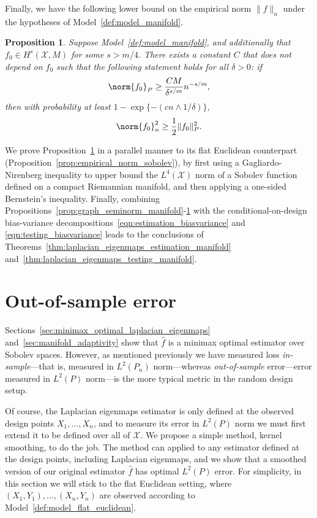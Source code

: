 \documentclass{article}
\newcommand{\1}{\mathbf{1}}
\newcommand{\Xset}{\mathcal{X}}
\newcommand{\Leb}{L}
\newcommand{\mc}[1]{\mathcal{#1}}
\newcommand{\wh}[1]{\widehat{#1}}
\theoremstyle{alden}
\theoremstyle{aldenthm}
\newtheorem{proposition}{Proposition}
\theoremstyle{definition}
\theoremstyle{remark}
\begin{document}
Finally, we have the following lower bound on the empirical norm $\|f\|_n$ under the hypotheses of Model~\ref{def:model_manifold}. 
\begin{proposition}
	\label{prop:empirical_norm_sobolev_manifold}
	Suppose Model~\ref{def:model_manifold}, and additionally that $f_0 \in H^s(\Xset,M)$ for some $s > m/4$. There exists a constant $C$ that does not depend on $f_0$ such that the following statement holds for all $\delta > 0$:  if
	\begin{equation}
	\label{eqn:empirical_norm_sobolev_manifold_1}
	\norm{f_0}_{P} \geq \frac{C M}{\delta^{s/m}}n^{-s/m},
	\end{equation}
	then with probability at least $1 - \exp\{-(cn \wedge 1/\delta)\}$,
	\begin{equation}
	\label{eqn:empirical_norm_sobolev_manifold}
	\norm{f_0}_n^2 \geq \frac{1}{2} \|f_0\|_P^2.
	\end{equation}
\end{proposition}
We prove Proposition~\ref{prop:empirical_norm_sobolev_manifold} in a parallel manner to its flat Euclidean counterpart (Proposition~\ref{prop:empirical_norm_sobolev}), by first using a Gagliardo-Nirenberg inequality to upper bound the $L^4(\mc{X})$ norm of a Sobolev function defined on a compact Riemannian manifold, and then applying a one-sided Bernstein's inequality. Finally, combining Propositions~\ref{prop:graph_seminorm_manifold}-\ref{prop:empirical_norm_sobolev_manifold} with the conditional-on-design bias-variance decompositions~\eqref{eqn:estimation_biasvariance} and \eqref{eqn:testing_biasvariance} leads to the conclusions of Theorems~\ref{thm:laplacian_eigenmaps_estimation_manifold} and~\ref{thm:laplacian_eigenmaps_testing_manifold}. 

\section{Out-of-sample error}
\label{sec:out_of_sample}
Sections~\ref{sec:minimax_optimal_laplacian_eigenmaps} and~\ref{sec:manifold_adaptivity} show that $\wh{f}$ is a minimax optimal estimator over Sobolev spaces. However, as mentioned previously we have measured loss \emph{in-sample}---that is, measured in $\Leb^2(P_n)$ norm---whereas \emph{out-of-sample} error---error measured in $L^2(P)$ norm---is the more typical metric in the random design setup.

Of course, the Laplacian eigenmaps estimator is only defined at the observed design points $X_1,\ldots,X_n$, and to measure its error in $L^2(P)$ norm we must first extend it to be defined over all of $\Xset$. We propose a simple method, kernel smoothing, to do the job. The method can applied to any estimator defined at the design points, including Laplacian eigenmaps, and we show that a smoothed version of our original estimator $\wh{f}$ has optimal $L^2(P)$ error. For simplicity, in this section we will stick to the flat Euclidean setting, where $(X_1,Y_1),\ldots,(X_n,Y_n)$ are observed according to Model~\ref{def:model_flat_euclidean}.
\end{document}
